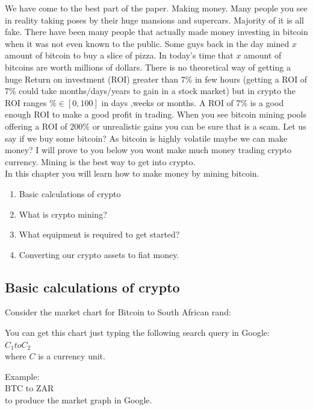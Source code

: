 We have come to the best part of the paper. Making money. Many people you see in reality taking poses by their huge mansions and supercars. Majority of it is all fake. There have been many people that actually made money investing in bitcoin when it was not even known to the public. Some guys back in the day mined $x$ amount of bitcoin to buy a slice of pizza. In today's time that $x$ amount of bitcoins are worth millions of dollars.
There is no theoretical way of getting a huge Return on investment (ROI) greater than 7\% in few hours (getting a ROI of 7\% could take months/days/years to gain in a stock market) but in crypto the ROI ranges $\% \in [0,100]$ in days ,weeks or months. A ROI of 7\% is a good enough ROI to make a good profit in trading. When you see bitcoin mining pools offering a ROI of 200\% or unrealistic gains you can be sure that is a scam. Let us say if we buy some bitcoin? As bitcoin is highly volatile maybe we can make money? I will prove to you below you wont make much money trading crypto currency. Mining is the best way to get into crypto. \\ 

In this chapter you will learn how to make money by mining bitcoin.
\begin{enumerate}
\item Basic calculations of crypto    
\item What is crypto mining?
\item What equipment is required to get started?
\item Converting our crypto assets to fiat money.
\end{enumerate}

\subsection{Basic calculations of crypto}

Consider the market chart for Bitcoin to South African rand:

You can get this chart just typing the following search query in Google: \\

$C_1 to C_2$ \\ 

where $C$ is a currency unit.

Example: \\

BTC to ZAR \\

to produce the market graph in Google.

